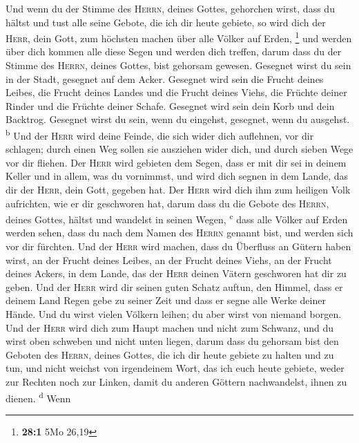  Und wenn du der Stimme des \textsc{Herrn}, deines Gottes,
gehorchen wirst, dass du hältst und tust alle seine Gebote, die ich dir
heute gebiete, so wird dich der \textsc{Herr}, dein Gott, zum höchsten
machen über alle Völker auf Erden, \footnote{\textbf{28:1} 5Mo 26,19}
 und werden über dich kommen alle diese Segen und werden
dich treffen, darum dass du der Stimme des \textsc{Herrn}, deines
Gottes, bist gehorsam gewesen.  Gesegnet wirst du sein in
der Stadt, gesegnet auf dem Acker.  Gesegnet wird sein die
Frucht deines Leibes, die Frucht deines Landes und die Frucht deines
Viehs, die Früchte deiner Rinder und die Früchte deiner Schafe.
 Gesegnet wird sein dein Korb und dein Backtrog.
 Gesegnet wirst du sein, wenn du eingehst, gesegnet, wenn
du ausgehst. \textsuperscript{b}  Und der \textsc{Herr}
wird deine Feinde, die sich wider dich auflehnen, vor dir schlagen;
durch einen Weg sollen sie ausziehen wider dich, und durch sieben Wege
vor dir fliehen.  Der \textsc{Herr} wird gebieten dem
Segen, dass er mit dir sei in deinem Keller und in allem, was du
vornimmst, und wird dich segnen in dem Lande, das dir der \textsc{Herr},
dein Gott, gegeben hat.  Der \textsc{Herr} wird dich ihm
zum heiligen Volk aufrichten, wie er dir geschworen hat, darum dass du
die Gebote des \textsc{Herrn}, deines Gottes, hältst und wandelst in
seinen Wegen, \textsuperscript{c}  dass alle Völker auf
Erden werden sehen, dass du nach dem Namen des \textsc{Herrn} genannt
bist, und werden sich vor dir fürchten.  Und der
\textsc{Herr} wird machen, dass du Überfluss an Gütern haben wirst, an
der Frucht deines Leibes, an der Frucht deines Viehs, an der Frucht
deines Ackers, in dem Lande, das der \textsc{Herr} deinen Vätern
geschworen hat dir zu geben.  Und der \textsc{Herr} wird
dir seinen guten Schatz auftun, den Himmel, dass er deinem Land Regen
gebe zu seiner Zeit und dass er segne alle Werke deiner Hände. Und du
wirst vielen Völkern leihen; du aber wirst von niemand borgen.
 Und der \textsc{Herr} wird dich zum Haupt machen und
nicht zum Schwanz, und du wirst oben schweben und nicht unten liegen,
darum dass du gehorsam bist den Geboten des \textsc{Herrn}, deines
Gottes, die ich dir heute gebiete zu halten und zu tun, 
und nicht weichst von irgendeinem Wort, das ich euch heute gebiete,
weder zur Rechten noch zur Linken, damit du anderen Göttern
nachwandelst, ihnen zu dienen. \textsuperscript{d}  Wenn
